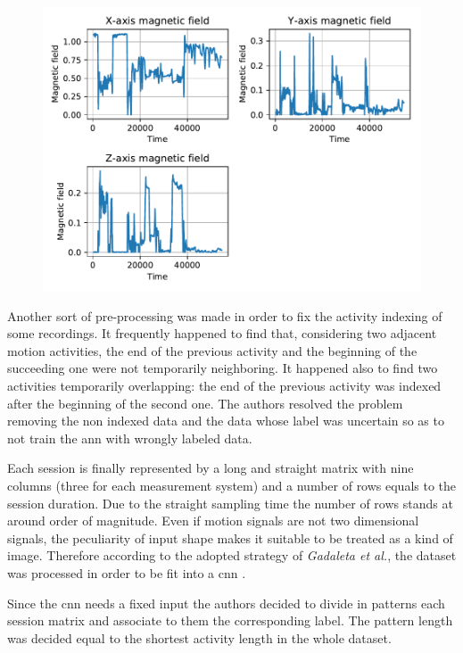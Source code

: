 \begin{figure}[htp]
\includegraphics[scale=0.55]{magnetic_field_susanna.pdf}
\caption{}
\label{fig:mag}
\end{figure}


Another sort of pre-processing was made in order to fix the activity indexing of some recordings. It frequently happened to find that, considering two adjacent motion activities, the end of the previous activity and the beginning of the succeeding one were not temporarily neighboring. It happened also to find two activities temporarily overlapping: the end of the previous activity was indexed after the beginning of the second one. 
The authors resolved the problem removing the non indexed data and the data whose label was uncertain so as to not train the \gls{ann} with wrongly labeled data.

Each session is finally represented by a long and straight matrix with nine columns (three for each measurement system) and a number of rows equals to the session duration. Due to the straight sampling time the number of rows stands at around  order of magnitude. Even if motion signals are not two dimensional signals, the peculiarity of input shape makes it suitable to be treated as a kind of image. Therefore according to the adopted strategy of \textit{Gadaleta et al.}, the dataset was processed in order to be fit into a \gls{cnn} \cite{Gadaleta-2018}.


Since the \gls{cnn} needs a fixed input the authors decided to divide in patterns each session matrix and associate to them the corresponding label. The pattern length was decided equal to the shortest activity length in the whole dataset.



